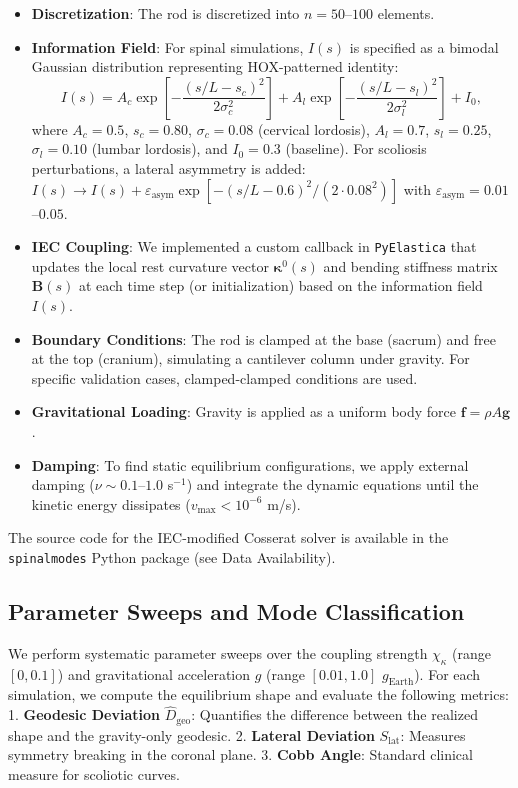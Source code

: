 \begin{itemize}
    \item \textbf{Discretization}: The rod is discretized into $n=50$--$100$ elements.
    \item \textbf{Information Field}: For spinal simulations, $I(s)$ is specified as a bimodal Gaussian distribution representing HOX-patterned identity:
    \begin{equation}
    I(s) = A_c \exp\left[-\frac{(s/L - s_c)^2}{2\sigma_c^2}\right] + A_l \exp\left[-\frac{(s/L - s_l)^2}{2\sigma_l^2}\right] + I_0,
    \label{eq:info_field_spinal}
    \end{equation}
    where $A_c = 0.5$, $s_c = 0.80$, $\sigma_c = 0.08$ (cervical lordosis), $A_l = 0.7$, $s_l = 0.25$, $\sigma_l = 0.10$ (lumbar lordosis), and $I_0 = 0.3$ (baseline). For scoliosis perturbations, a lateral asymmetry is added: $I(s) \to I(s) + \varepsilon_{\mathrm{asym}} \exp[-(s/L - 0.6)^2/(2 \cdot 0.08^2)]$ with $\varepsilon_{\mathrm{asym}} = 0.01$--$0.05$.
    \item \textbf{IEC Coupling}: We implemented a custom callback in \texttt{PyElastica} that updates the local rest curvature vector $\bm{\kappa}^0(s)$ and bending stiffness matrix $\mathbf{B}(s)$ at each time step (or initialization) based on the information field $I(s)$.
    \item \textbf{Boundary Conditions}: The rod is clamped at the base (sacrum) and free at the top (cranium), simulating a cantilever column under gravity. For specific validation cases, clamped-clamped conditions are used.
    \item \textbf{Gravitational Loading}: Gravity is applied as a uniform body force $\mathbf{f} = \rho A \mathbf{g}$.
    \item \textbf{Damping}: To find static equilibrium configurations, we apply external damping ($\nu \sim 0.1$--$1.0$ s$^{-1}$) and integrate the dynamic equations until the kinetic energy dissipates ($v_{\max} < 10^{-6}$ m/s).
\end{itemize}

The source code for the IEC-modified Cosserat solver is available in the \texttt{spinalmodes} Python package (see Data Availability).

\subsection{Parameter Sweeps and Mode Classification}

We perform systematic parameter sweeps over the coupling strength $\chi_\kappa$ (range $[0, 0.1]$) and gravitational acceleration $g$ (range $[0.01, 1.0]$ $g_{\mathrm{Earth}}$). For each simulation, we compute the equilibrium shape and evaluate the following metrics:
1.  \textbf{Geodesic Deviation} $\widehat{D}_{\mathrm{geo}}$: Quantifies the difference between the realized shape and the gravity-only geodesic.
2.  \textbf{Lateral Deviation} $S_{\mathrm{lat}}$: Measures symmetry breaking in the coronal plane.
3.  \textbf{Cobb Angle}: Standard clinical measure for scoliotic curves.

